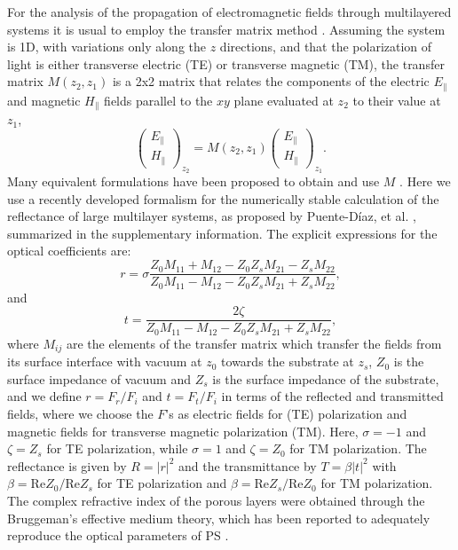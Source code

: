 \documentclass[a4paper,fleqn]{cas-sc}
\begin{document}
For the analysis of the propagation of electromagnetic fields through
multilayered systems it is usual to employ the transfer matrix
method \cite{PerezA2004,Pochi2005}. Assuming the system is 1D, with variations
only along the $z$ directions, and that the polarization of light is either
transverse electric (TE) or transverse magnetic (TM), the
transfer matrix $M\left(z_{2},z_{1}\right)$ is
a 2x2 matrix that relates the components of the electric $E_{\| }$
and magnetic  $H_{\|}$ fields parallel to the $xy$ plane
evaluated at $z_2$ to their value at $z_{1}$,
\begin{equation*}
        \left(
        \begin{array}{c}
                E_{\|} \\
                H_{\| }%
        \end{array}%
        \right) _{z_{2}}=M\left( z_{2},z_{1}\right) \left(
        \begin{array}{c}
                E_{\| } \\
                H_{\| }%
        \end{array}%
        \right) _{z_{1}}.
\end{equation*}%
Many equivalent formulations have been proposed to obtain and use $M$
\cite{Mochan1987,Ortiz2020,Chavez2020}. Here we use a recently developed formalism
for the numerically stable calculation of the reflectance of large
multilayer systems, as
proposed by Puente-D\'{i}az, et al. \cite{Puente2020}, summarized in the
supplementary information. The
explicit expressions for the optical coefficients are:
\begin{equation}
        r=\sigma \frac{Z_{0}M_{11}+M_{12}-Z_{0}Z_{s}M_{21}-Z_s
                M_{22}}{Z_{0}M_{11}-M_{12}-Z_{0}Z_{s}M_{21}+Z_{s}M_{22}},  \label{rBloch}
\end{equation}%
and
\begin{equation}
        t=\frac{2\zeta}{Z_{0}M_{11}-M_{12}-Z_{0}Z_{s}M_{21}+Z_{s}M_{22}},  \label{tBloch}
\end{equation}%
where $M_{ij}$ are the elements
of the transfer matrix which transfer
the fields from its surface interface with vacuum at $z_0$ towards the
substrate at $z_s$,  $Z_0$ is the surface impedance of vacuum and $Z_s$ is the
surface impedance of the substrate, and we define $r=F_r/F_i$ and $t=F_t/F_i$ in terms
of the reflected and transmitted fields, where we choose the $F$'s as electric
fields for (TE) polarization and magnetic fields
for transverse magnetic polarization (TM). Here, $\sigma=-1$ and
$\zeta= Z_s$ for TE polarization, while
$\sigma=1$ and $\zeta=Z_0$ for TM
polarization.
The reflectance is given by
$R=|r|^{2}$ and the
transmittance by $T=\beta \left\vert t\right\vert ^{2}$ with $\beta
=\text{Re}Z_{0}/\text{Re}Z_{s}$ for TE polarization and $\beta =\text{Re}Z_{s}/\text{Re}Z_{0}$ for
TM polarization. The complex refractive index of the porous
layers were obtained through the Bruggeman's effective medium theory, which
has been reported to adequately reproduce the  optical parameters of PS
\cite{Giusseppe2011,Pap2006,Estrada2018}.
\end{document}
